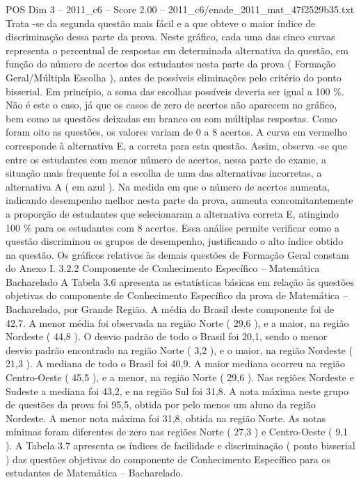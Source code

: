 \begin{textsample}{POS Dim 3 – 2011\_c6 – Score 2.00 – 2011\_c6/enade\_2011\_mat\_47f2529b35.txt}
Trata -se da segunda questão mais fácil e a que obteve o maior índice de discriminação dessa parte da prova.
Neste gráfico, cada uma das cinco curvas representa o percentual de respostas em determinada alternativa da questão, em função do número de acertos dos estudantes nesta parte da prova ( Formação Geral/Múltipla Escolha ), antes de possíveis eliminações pelo critério do ponto bisserial.
Em princípio, a soma das escolhas possíveis deveria ser igual a 100 \%.
Não é este o caso, já que os casos de zero de acertos não aparecem no gráfico, bem como as questões deixadas em branco ou com múltiplas respostas.
Como foram oito as questões, os valores variam de 0 a 8 acertos.
A curva em vermelho corresponde à alternativa E, a correta para esta questão.
Assim, observa -se que entre os estudantes com menor número de acertos, nessa parte do exame, a situação mais frequente foi a escolha de uma das alternativas incorretas, a alternativa A ( em azul ).
Na medida em que o número de acertos aumenta, indicando desempenho melhor nesta parte da prova, aumenta concomitantemente a proporção de estudantes que selecionaram a alternativa correta E, atingindo 100 \% para os estudantes com 8 acertos.
Essa análise permite verificar como a questão discriminou os grupos de desempenho, justificando o alto índice obtido na questão.
Os gráficos relativos às demais questões de Formação Geral constam do Anexo I. 3.2.2 Componente de Conhecimento Específico – Matemática Bacharelado A Tabela 3.6 apresenta as estatísticas básicas em relação às questões objetivas do componente de Conhecimento Específico da prova de Matemática – Bacharelado, por Grande Região.
A média do Brasil deste componente foi de 42,7.
A menor média foi observada na região Norte ( 29,6 ), e a maior, na região Nordeste ( 44,8 ).
O desvio padrão de todo o Brasil foi 20,1, sendo o menor desvio padrão encontrado na região Norte ( 3,2 ), e o maior, na região Nordeste ( 21,3 ).
A mediana de todo o Brasil foi 40,9.
A maior mediana ocorreu na região Centro-Oeste ( 45,5 ), e a menor, na região Norte ( 29,6 ).
Nas regiões Nordeste e Sudeste a mediana foi 43,2, e na região Sul foi 31,8.
A nota máxima neste grupo de questões da prova foi 95,5, obtida por pelo menos um aluno da região Nordeste.
A menor nota máxima foi 31,8, obtida na região Norte.
As notas mínimas foram diferentes de zero nas regiões Norte ( 27,3 ) e Centro-Oeste ( 9,1 ).
A Tabela 3.7 apresenta os índices de facilidade e discriminação ( ponto bisserial ) das questões objetivas do componente de Conhecimento Específico para os estudantes de Matemática – Bacharelado.

\end{textsample}
